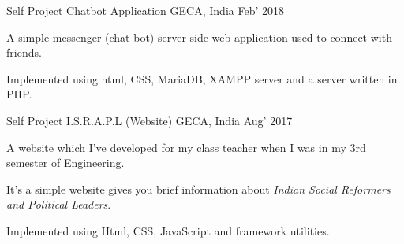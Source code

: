﻿%


\begin{cventries}

  \cventry
    {Self Project}  
    {Chatbot Application} %
    {GECA, India} %
    {Feb’ 2018} %
    {
      \begin{cvitems} %
      	\item {A simple messenger (chat-bot) server-side web application used to connect with friends.}
        \item {Implemented using html, CSS, MariaDB, XAMPP server and a server written in PHP.} 
      \end{cvitems}
    }

  \cventry
    {Self Project} %
    {I.S.R.A.P.L (Website)} %
    {GECA, India} %
    {Aug’ 2017} %
    {
      \begin{cvitems} %
        \item {A website which I’ve developed for my class teacher when I was in my 3rd semester of Engineering.}
        \item {It’s a simple website gives you brief information about {\em Indian Social Reformers and Political Leaders}.}
        \item {Implemented using Html, CSS, JavaScript and framework utilities.}
      \end{cvitems}
    }
\end{cventries}
